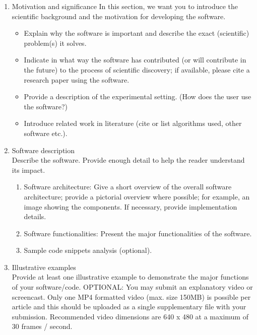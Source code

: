 \documentclass[preprint,12pt, a4paper]{elsarticle}
\begin{document}
\begin{enumerate}

\item Motivation and significance
In this section, we want you to introduce the scientific background and the motivation for developing the software.

\begin{itemize}
    \item Explain why the software is important and describe the exact (scientific) problem(s) it solves.
    \item Indicate in what way the software has contributed (or will contribute in the future) to the process of scientific discovery; if available, please cite a research paper using the software.
    \item Provide a description of the experimental setting. (How does the user use the software?)
    \item Introduce related work in literature (cite or list algorithms used, other software etc.).\\
\end{itemize}

\item Software description\\

Describe the software. Provide enough detail to help the reader understand its impact. 

\begin{enumerate}
    \item Software architecture: Give a short overview of the overall software architecture; provide a pictorial overview where possible; for example, an image showing the components. If necessary, provide implementation details.
    \item Software functionalities: Present the major functionalities of the software.
    \item Sample code snippets analysis (optional).\\
\end{enumerate}

\item Illustrative examples\\

Provide at least one illustrative example to demonstrate the major functions of your software/code.
OPTIONAL: You may submit an explanatory video or screencast. Only one MP4 formatted video (max. size 150MB) is possible per article and this should be uploaded as a single supplementary file with your submission. Recommended video dimensions are 640 x 480 at a maximum of 30 frames / second.\\


\end{enumerate}
\end{document}
